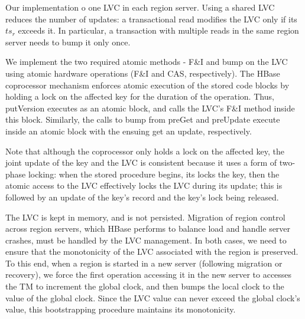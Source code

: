 Our implementation o one LVC in each region server. 
Using a shared LVC reduces the number of updates:  
a transactional read modifies the LVC only if its $ts_r$ exceeds it. In particular, 
a transaction with multiple reads in the same region server needs to bump it only once. 

We implement the two required atomic methods - F\&I and bump on the LVC using atomic hardware operations (F\&I and CAS, respectively). 
The HBase coprocessor mechanism enforces atomic execution of the stored code blocks by holding  a lock on the affected key for the duration of the operation.
Thus, putVersion executes as an atomic block, and calls the LVC's F\&I method inside this block.
Similarly, the calls to bump from preGet and preUpdate execute inside an atomic block with the ensuing get an update, respectively. 

Note that although the coprocessor only holds a lock on the affected key, the joint update of the key and the LVC is consistent
because it uses a form of two-phase locking: when the stored procedure begins, its locks the key, then the atomic access to the LVC
effectively locks the LVC during its update; this is followed by an update of the key's record and the key's lock being released.

The LVC is kept in memory, and is not persisted. Migration of region control across region servers, which HBase performs 
to balance load and handle server crashes, must be handled by the LVC management. 
In both cases, we need to ensure that the monotonicity of the LVC associated with the %
region is preserved. To this end, when a region is started in a new server (following migration or recovery), 
we force the first operation accessing it
in the new server to accesses the TM to increment the global clock, and then 
bumps the local clock to the value of the global clock.
Since the LVC value can never exceed the global clock's value, this bootstrapping procedure maintains its monotonicity.



